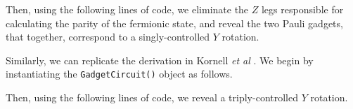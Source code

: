 
Then, using the following lines of code, we eliminate the $Z$ legs responsible for calculating the parity of the fermionic state, and reveal the two Pauli gadgets, that together, correspond to a singly-controlled $Y$ rotation.


Similarly, we can replicate the derivation in Kornell \textit{et al} \cite{Kornell2023}. We begin by instantiating the \lstinline{GadgetCircuit()} object as follows.


Then, using the following lines of code, we reveal a triply-controlled $Y$ rotation.


